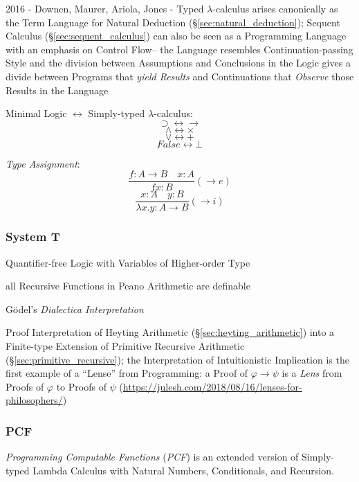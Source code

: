 2016 - Downen, Maurer, Ariola, Jones - Typed $\lambda$-calculus arises
canonically as the Term Language for Natural Deduction
(\S\ref{sec:natural_deduction}); Sequent Calculus
(\S\ref{sec:sequent_calculus}) can also be seen as a Programming Language with
an emphasis on Control Flow-- the Language resembles Continuation-passing Style
and the division between Assumptions and Conclusions in the Logic gives a
divide between Programs that \emph{yield Results} and Continuations that
\emph{Observe} those Results in the Language


Minimal Logic $\leftrightarrow$ Simply-typed $\lambda$-calculus:
\[
  \supset \leftrightarrow \rightarrow
\] \[
  \wedge \leftrightarrow \times
\] \[
  \vee \leftrightarrow +
\] \[
  False \leftrightarrow \bot
\]



\emph{Type Assignment}:
\[
  \frac{
    f:A \rightarrow B \quad x:A
  }{
    f x : B
  }(\rightarrow e)
\]\[
  \frac{
    x:A \quad y:B
  }{
    \lambda x.y : A \rightarrow B
  }(\rightarrow i)
\]



\subsubsection{System T}\label{sec:system_t}

Quantifier-free Logic with Variables of Higher-order Type

all Recursive Functions in Peano Arithmetic are definable

G\"odel's \emph{Dialectica Interpretation}

Proof Interpretation of Heyting Arithmetic (\S\ref{sec:heyting_arithmetic}) into
a Finite-type Extension of Primitive Recursive Arithmetic
(\S\ref{sec:primitive_recursive});
the Interpretation of Intuitionistic Implication
is the first example of a ``Lense'' from
Programming: a Proof of $\varphi \rightarrow \psi$ is a \emph{Lens} from Proofs
of $\varphi$ to Proofs of $\psi$
(\url{https://julesh.com/2018/08/16/lenses-for-philosophers/})



\subsubsection{PCF}\label{sec:pcf}

\emph{Programming Computable Functions} (\emph{PCF}) is an extended
version of Simply-typed Lambda Calculus with Natural Numbers,
Conditionals, and Recursion.

